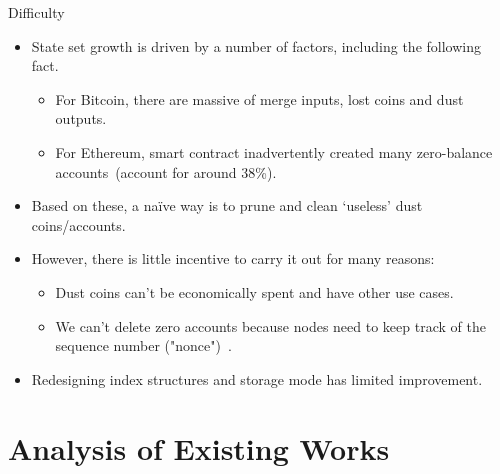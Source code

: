 \documentclass[biblatex,aspectratio=169,11pt]{mybeamer}
\begin{document}
\begin{frame}{Difficulty}
  \begin{itemize}
    \item State set growth is driven by a number of factors, including the following fact.
     \begin{itemize}
       \item For \alert{Bitcoin}, there are massive of merge inputs, lost coins and dust outputs.
       \item For \alert{Ethereum}, smart contract inadvertently created many \alert{zero-balance accounts}~(account for around 38\%).
     \end{itemize}
    \item Based on these, a na\"ive way is to prune and clean `useless' dust coins/accounts.
    \item However, there is little incentive to carry it out for many reasons:
     \begin{itemize}
       \item Dust coins can't be economically spent and have other use cases.
       \item We can't delete zero accounts because nodes need to keep track of the sequence number ("nonce")~\cite{wood2014ethereum}.
     \end{itemize}
    \item Redesigning index structures and storage mode has limited improvement.
  \end{itemize}
\end{frame}


\section{Analysis of Existing Works}
\end{document}
